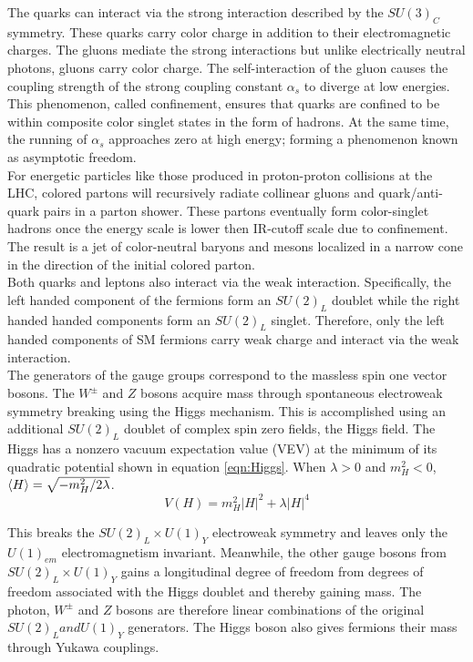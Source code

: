 \indent The quarks can interact via the strong interaction described by the $SU(3)_C$ symmetry.  These quarks carry color charge in addition to their electromagnetic charges.  The gluons mediate the strong interactions but unlike electrically neutral photons, gluons carry color charge.  The self-interaction of the gluon causes the coupling strength of the strong coupling constant $\alpha_s$ to diverge at low energies.  This phenomenon, called confinement, ensures that quarks are confined to be within composite color singlet states in the form of hadrons.  At the same time, the running of $\alpha_s$ approaches zero at high energy; forming a phenomenon known as asymptotic freedom. \\

\indent For energetic particles like those produced in proton-proton collisions at the LHC, colored partons will recursively radiate collinear gluons and quark/anti-quark pairs in a parton shower. These partons eventually form color-singlet hadrons once the energy scale is lower then IR-cutoff scale due to confinement.  The result is a jet of color-neutral baryons and mesons localized in a narrow cone in the direction of the initial colored parton. \\

\indent Both quarks and leptons also interact via the weak interaction.  Specifically, the left handed component of the fermions form an $SU(2)_L$ doublet while the right handed handed components form an $SU(2)_L$ singlet.  Therefore, only the left handed components of SM fermions carry weak charge and interact via the weak interaction.  \\

\indent The generators of the gauge groups correspond to the massless spin one vector bosons.  The $W^\pm$ and $Z$ bosons acquire mass through spontaneous electroweak symmetry breaking using the Higgs mechanism.  This is accomplished using an additional $SU(2)_L$ doublet of complex spin zero fields, the Higgs field.  The Higgs has a nonzero vacuum expectation value (VEV) at the minimum of its quadratic potential shown in equation \ref{eqn:Higgs}.  When $\lambda > 0$ and $m_H^2 < 0 $, $\braket{H} = \sqrt{-m_H^2/2\lambda}$.  \\

\begin{equation}
\label{eqn:Higgs}
V(H) = m_H^2 |H|^2 +\lambda |H|^4
\end{equation}

\indent This breaks the $SU(2)_L \times U(1)_Y$ electroweak symmetry and leaves only the $U(1)_{em}$ electromagnetism invariant.  Meanwhile, the other gauge bosons from $SU(2)_L \times U(1)_Y$ gains a longitudinal degree of freedom from degrees of freedom associated with the Higgs doublet and thereby gaining mass.  The photon, $W^\pm$ and $Z$ bosons are therefore linear combinations of the original $SU(2)_L and U(1)_Y$ generators.  The Higgs boson also gives fermions their mass through Yukawa couplings. \\

